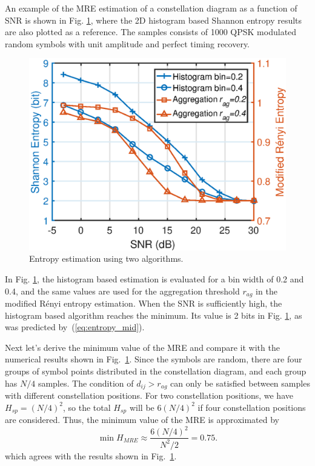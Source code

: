 \documentclass[journal,comsoc, onecolumn, 12pt,draftclsnofoot]{IEEEtran} %
\begin{document}

An example of the MRE estimation of a constellation diagram as a function of SNR is shown in Fig. \ref{fig:MRE}, where the 2D histogram based Shannon entropy results are also plotted as a reference.
The samples consists of 1000 QPSK modulated random symbols with unit amplitude and perfect timing recovery.

\begin{figure}[ht]
\centering
\includegraphics[width=3 in]{pic/H_MR.eps}
\caption{Entropy estimation using two algorithms.}
\label{fig:MRE} 
\end{figure}

In Fig. \ref{fig:MRE}, the histogram based estimation is evaluated for a bin width of 0.2 and 0.4, and the same values are used for the aggregation threshold \(r_{ag}\) in the modified R\'enyi entropy estimation.
When the SNR is sufficiently high, the histogram based algorithm reaches the minimum. 
Its value is 2 bits in Fig. \ref{fig:MRE}, as was predicted by~(\ref{eq:entropy_mid}).

Next let's derive the minimum value of the MRE and compare it with the numerical results shown in Fig.~\ref{fig:MRE}.
Since the symbols are random, there are four groups of symbol points distributed in the constellation diagram, and each group has \(N/4\) samples.
The condition of $d_{ij}>r_{ag}$ can only be satisfied between samples with different constellation positions.
For two constellation positions, we have $H_{sp} = (N/4)^2$, so the total $H_{sp}$ will be $6 (N/4)^2$ if four constellation positions are considered.
Thus, the minimum value of the MRE is approximated by
\begin{equation}
\min{H_{MRE}} \approx \frac{ 6 \left(N/4\right)^2}{N^2/2}=0.75.
\label{eq:adEntQPSK}
\end{equation}
which agrees with the results shown in Fig.~\ref{fig:MRE}.
\end{document}
